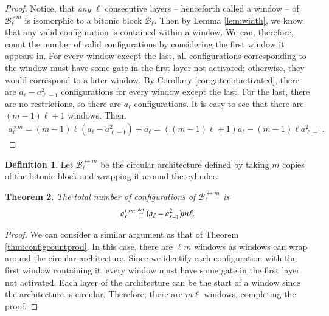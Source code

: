 \documentclass[11pt,letterpaper]{article}
\newtheorem{theorem}{Theorem}[section]
\theoremstyle{definition}
\newtheorem{definition}[theorem]{Definition}
\theoremstyle{remark}
\newcommand{\defeq}{\stackrel{\mbox{\normalfont\tiny def}}=}
\newcommand{\cB}{\mathcal B}
\numberwithin{equation}{section}
\theoremstyle{definition}
\begin{document}
\begin{proof}
Notice, that \emph{any} $\ell$ consecutive layers -- henceforth called a window -- of $\cB_\ell^{\times m}$ is isomorphic to a bitonic block $\cB_\ell$. Then by Lemma \ref{lem:width}, we know that any valid configuration is contained within a window. We can, therefore, count the number of valid configurations by considering the first window it appears in. For every window except the last, all configurations corresponding to the window must have some gate in the first layer not activated; otherwise, they would correspond to a later window. By Corollary \ref{cor:gatenotactivated}, there are $a_\ell - a_{\ell - 1}^2$ configurations for every window except the last. For the last, there are no restrictions, so there are $a_{\ell}$ configurations. It is easy to see that there are $(m-1)\ell + 1$ windows. Then,
\begin{equation}
\begin{aligned}
a_\ell^{\times m} = (m-1)\ell (a_\ell - a_{\ell - 1}^2) + a_\ell = \left(\left(m-1\right)\ell+1\right)a_\ell-(m-1)\ell a_{\ell-1}^2.
\end{aligned}
\end{equation}
\end{proof}

%
%
%
%
%

%


%

%

%

%

%

%
%
%
%
%
%
%


%

%


%

\begin{definition}
Let $\cB_\ell^{\leftrightarrow m}$ be the circular architecture defined by taking $m$ copies of the bitonic block and wrapping it around the cylinder.
\label{def:circularwrapping}
\end{definition}

\begin{theorem}
The total number of configurations of $\cB_\ell^{\leftrightarrow m}$ is
\begin{equation}
a_\ell^{\leftrightarrow m} \defeq (a_\ell - a_{\ell - 1}^2) m \ell.
\end{equation}
\label{thm:countcircular}
\end{theorem}

\begin{proof}
We can consider a similar argument as that of Theorem \ref{thm:configcountprod}. In this case, there are $\ell m$ windows as windows can wrap around the circular architecture. Since we identify each configuration with the first window containing it, every window must have some gate in the first layer not activated. Each layer of the architecture can be the start of a window since the architecture is circular. Therefore, there are $m \ell$ windows, completing the proof.
\end{proof}
\end{document}
